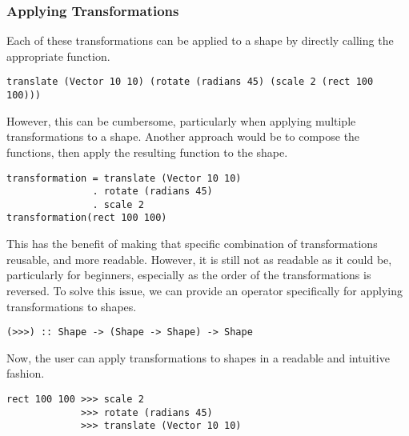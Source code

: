 \documentclass[../main.tex]{subfiles}
\begin{document}
            \subsubsection{Applying Transformations}
                Each of these transformations can be applied to a shape by directly calling the
                    appropriate function.

                \begin{lstlisting}
translate (Vector 10 10) (rotate (radians 45) (scale 2 (rect 100 100)))\end{lstlisting}

                However, this can be cumbersome, particularly when applying multiple
                    transformations to a shape.
                Another approach would be to compose the functions, then apply the resulting
                    function to the shape.

                \begin{lstlisting}
transformation = translate (Vector 10 10)
               . rotate (radians 45)
               . scale 2
transformation(rect 100 100)\end{lstlisting}

                This has the benefit of making that specific combination of transformations
                    reusable, and more readable.
                However, it is still not as readable as it could be, particularly for
                    beginners, especially as the order of the transformations is reversed.
                To solve this issue, we can provide an operator specifically for applying
                    transformations to shapes.

                \begin{lstlisting}[label={lst:transform}, caption={The transformation operator.}]
(>>>) :: Shape -> (Shape -> Shape) -> Shape\end{lstlisting}

                Now, the user can apply transformations to shapes in a readable and intuitive
                    fashion.

                \begin{lstlisting}
rect 100 100 >>> scale 2
             >>> rotate (radians 45)
             >>> translate (Vector 10 10)\end{lstlisting}
\end{document}
